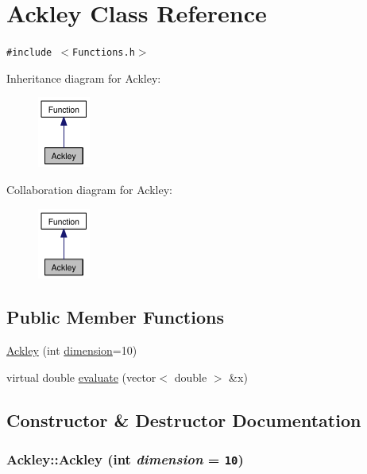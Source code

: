 \hypertarget{classAckley}{
\section{Ackley Class Reference}
\label{classAckley}
}
{\tt \#include $<$Functions.h$>$}

Inheritance diagram for Ackley:\nopagebreak
\begin{figure}[H]
\begin{center}
\leavevmode
\includegraphics[width=49pt]{classAckley__inherit__graph}
\end{center}
\end{figure}
Collaboration diagram for Ackley:\nopagebreak
\begin{figure}[H]
\begin{center}
\leavevmode
\includegraphics[width=49pt]{classAckley__coll__graph}
\end{center}
\end{figure}
\subsection*{Public Member Functions}
\begin{CompactItemize}
\item 
\hyperlink{classAckley_6f846d6b110026aa8f6d59ce7f1caf9a}{Ackley} (int \hyperlink{aco-r_8cpp_1a8a8235879363159315091a1daed72f}{dimension}=10)
\item 
virtual double \hyperlink{classAckley_6423fcd54b72322f08357879bac580b6}{evaluate} (vector$<$ double $>$ \&x)
\end{CompactItemize}


\subsection{Constructor \& Destructor Documentation}
\hypertarget{classAckley_6f846d6b110026aa8f6d59ce7f1caf9a}{
\subsubsection{\setlength{\rightskip}{0pt plus 5cm}Ackley::Ackley (int {\em dimension} = {\tt 10})}}
\label{classAckley_6f846d6b110026aa8f6d59ce7f1caf9a}




